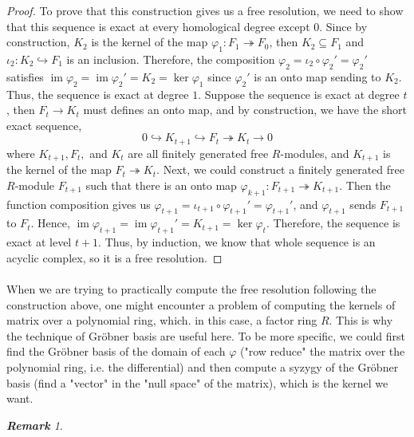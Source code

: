 \documentclass{article}
\newcommand{\im}{\ensuremath{\operatorname{im}}}
\renewcommand{\to}{\ensuremath{\rightarrow}}
\newcommand{\onto}{\ensuremath{\twoheadrightarrow}}
\newcommand{\into}{\ensuremath{\hookrightarrow}}
\theoremstyle{definition}
\theoremstyle{remark}
\newtheorem*{remark}{\textbf{Remark}}
\theoremstyle{example}
\begin{document}
\begin{proof}
    To prove that this construction gives us a free resolution, we need to show that this sequence is exact at every homological degree except $0$. Since by construction, $K_2$ is the kernel of the map $\varphi_1: F_1 \onto F_0$, then $K_2 \subseteq F_1$ and $\iota_2: K_2 \into F_1$ is an inclusion. Therefore, the composition $\varphi_2 = \iota_2 \circ \varphi_2' = \varphi_2'$ satisfies $\im \varphi_2 = \im \varphi_2' = K_2 = \ker \varphi_1$ since $\varphi_2'$ is an onto map sending to $K_2$. Thus, the sequence is exact at degree $1$. Suppose the sequence is exact at degree $t$, then $F_t \to K_t$ must defines an onto map, and by construction, we have the short exact sequence, 
    \begin{equation}
        0 \into K_{t+1} \into F_t \onto K_t \to 0
    \end{equation}
    where $K_{t+1}, F_t,$ and $K_t$ are all finitely generated free $R$-modules, and $K_{t+1}$ is the kernel of the map $F_{t} \onto K_t$. Next, we could construct a finitely generated free $R$-module $F_{t+1}$ such that there is an onto map $\varphi_{k+1}: F_{t+1} \onto K_{t+1}$. Then the function composition gives us $\varphi_{t+1} = \iota_{t+1} \circ \varphi_{t+1}' = \varphi_{t+1}'$, and $\varphi_{t+1}$ sends $F_{t+1}$ to $F_t$. Hence, $\im \varphi_{t+1} = \im \varphi_{t+1}' = K_{t+1} = \ker \varphi_{t}$. Therefore, the sequence is exact at level $t+1$. Thus, by induction, we know that whole sequence is an acyclic complex, so it is a free resolution.
\end{proof}

\paragraph{}

When we are trying to practically compute the free resolution following the construction above, one might encounter a problem of computing the kernels of matrix over a polynomial ring, which. in this case, a factor ring $R$. This is why the technique of Gröbner basis are useful here. To be more specific, we could first find the Gröbner basis of the domain of each $\varphi$ ("row reduce" the matrix over the polynomial ring, i.e. the differential) and then compute a syzygy of the Gröbner basis (find a "vector" in the "null space" of the matrix), which is the kernel we want.

\begin{remark}
    
\end{remark}
\end{document}

